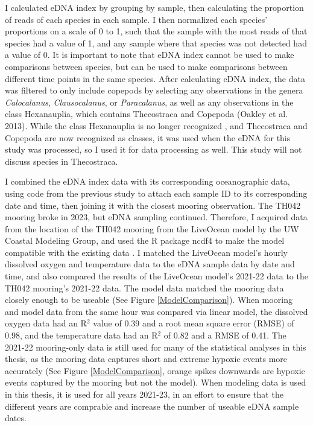 \documentclass[12pt,twoside]{reedthesis}
\begin{document}
	I calculated eDNA index by grouping by sample, then calculating the proportion of reads of each species in each sample. I then normalized each species' proportions on a scale of 0 to 1, such that the sample with the most reads of that species had a value of 1, and any sample where that species was not detected had a value of 0. It is important to note that eDNA index cannot be used to make comparisons between species, but can be used to make comparisons between different time points in the same species. After calculating eDNA index, the data was filtered to only include copepods by selecting any observations in the genera \textit{Calocalanus}, \textit{Clausocalanus}, or \textit{Paracalanus}, as well as any observations in the class Hexanauplia, which contains Thecostraca and Copepoda (Oakley et al. 2013). While the class Hexanauplia is no longer recognized \autocite{WoRMSWorldRegister, Lozano-Fernandez2019}, and Thecostraca and Copepoda are now recognized as classes, it was used when the eDNA for this study was processed, so I used it for data processing as well. This study will not discuss species in Thecostraca.
	
	I combined the eDNA index data with its corresponding oceanographic data, using code from the previous study to attach each sample ID to its corresponding date and time, then joining it with the closest mooring observation. The TH042 mooring broke in 2023, but eDNA sampling continued. Therefore, I acquired data from the location of the TH042 mooring from the LiveOcean model by the UW Coastal Modeling Group, and used the R package ncdf4 to make the model compatible with the existing data \autocite{LiveOceanHomepage, Pierce2025}. I matched the LiveOcean model's hourly dissolved oxygen and temperature data to the eDNA sample data by date and time, and also compared the results of the LiveOcean model's 2021-22 data to the TH042 mooring's 2021-22 data. The model data matched the mooring data closely enough to be useable (See Figure \ref{ModelComparison}). When mooring and model data from the same hour was compared via linear model, the dissolved oxygen data had an R$^2$ value of 0.39 and a root mean square error (RMSE) of 0.98, and the temperature data had an R$^2$ of 0.82 and a RMSE of 0.41. The 2021-22 mooring-only data is still used for many of the statistical analyses in this thesis, as the mooring data captures short and extreme hypoxic events more accurately (See Figure \ref{ModelComparison}, orange spikes downwards are hypoxic events captured by the mooring but not the model). When modeling data is used in this thesis, it is used for all years 2021-23, in an effort to ensure that the different years are comprable and increase the number of useable eDNA sample dates. 
	
\end{document}
